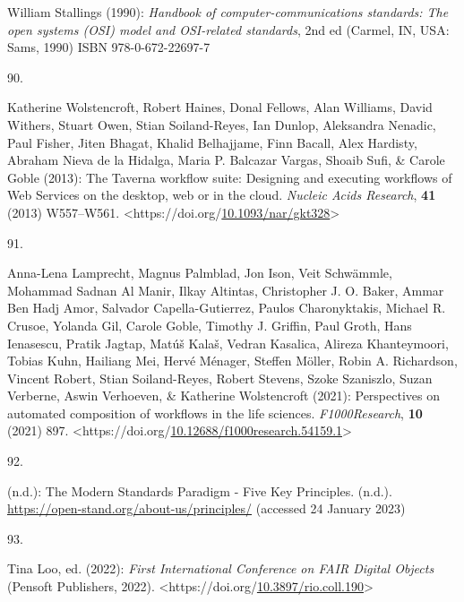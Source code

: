\begin{thebibliography}{9}
William Stallings (1990): \emph{Handbook of computer-communications
standards: {The} open systems ({OSI}) model and {OSI-related}
standards}, 2nd ed ({Carmel, IN, USA}: {Sams}, 1990) ISBN
978-0-672-22697-7

\hypertarget{ref-wolstencroftTavernaWorkflowSuite2013d}{}
90.

Katherine Wolstencroft, Robert Haines, Donal Fellows, Alan Williams,
David Withers, Stuart Owen, Stian Soiland-Reyes, Ian Dunlop, Aleksandra
Nenadic, Paul Fisher, Jiten Bhagat, Khalid Belhajjame, Finn Bacall, Alex
Hardisty, Abraham Nieva de la Hidalga, Maria P. Balcazar Vargas, Shoaib
Sufi, \& Carole Goble (2013): The {Taverna} workflow suite: Designing
and executing workflows of {Web Services} on the desktop, web or in the
cloud. \emph{Nucleic Acids Research}, \textbf{41} (2013) W557--W561.
\textless https://doi.org/\href{https://doi.org/10.1093/nar/gkt328}{10.1093/nar/gkt328}\textgreater{}

\hypertarget{ref-lamprechtPerspectivesAutomatedComposition2021b}{}
91.

Anna-Lena Lamprecht, Magnus Palmblad, Jon Ison, Veit Schwämmle, Mohammad
Sadnan Al Manir, Ilkay Altintas, Christopher J. O. Baker, Ammar Ben Hadj
Amor, Salvador Capella-Gutierrez, Paulos Charonyktakis, Michael R.
Crusoe, Yolanda Gil, Carole Goble, Timothy J. Griffin, Paul Groth, Hans
Ienasescu, Pratik Jagtap, Matúš Kalaš, Vedran Kasalica, Alireza
Khanteymoori, Tobias Kuhn, Hailiang Mei, Hervé Ménager, Steffen Möller,
Robin A. Richardson, Vincent Robert, Stian Soiland-Reyes, Robert
Stevens, Szoke Szaniszlo, Suzan Verberne, Aswin Verhoeven, \& Katherine
Wolstencroft (2021): Perspectives on automated composition of workflows
in the life sciences. \emph{F1000Research}, \textbf{10} (2021) 897.
\textless https://doi.org/\href{https://doi.org/10.12688/f1000research.54159.1}{10.12688/f1000research.54159.1}\textgreater{}

\hypertarget{ref-ModernStandardsParadigm}{}
92.

(n.d.): The {Modern Standards Paradigm} - {Five Key Principles}. (n.d.).
\url{https://open-stand.org/about-us/principles/} (accessed 24 January
2023)

\hypertarget{ref-looFirstInternationalConference2022}{}
93.

Tina Loo, ed. (2022): \emph{First {International Conference} on {FAIR
Digital Objects}} ({Pensoft Publishers}, 2022).
\textless https://doi.org/\href{https://doi.org/10.3897/rio.coll.190}{10.3897/rio.coll.190}\textgreater{}


\end{thebibliography}
